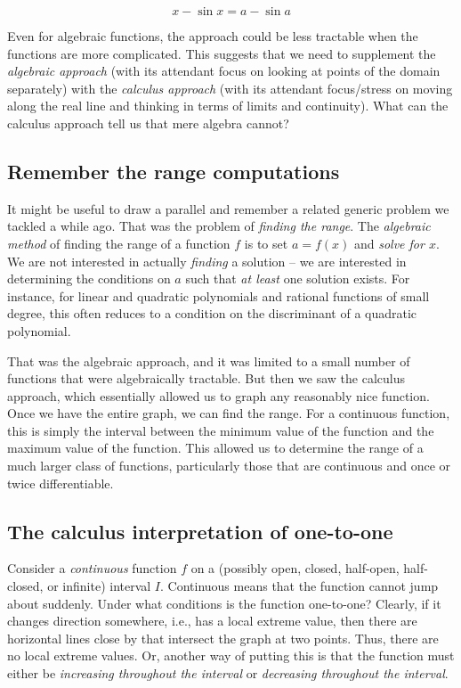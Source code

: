 \documentclass[10pt]{amsart}
\begin{document}
$$x - \sin x = a - \sin a$$

Even for algebraic functions, the approach could be less tractable
when the functions are more complicated. This suggests that we need to
supplement the {\em algebraic approach} (with its attendant focus on
looking at points of the domain separately) with the {\em calculus
approach} (with its attendant focus/stress on moving along the real
line and thinking in terms of limits and continuity). What can the
calculus approach tell us that mere algebra cannot?

\subsection{Remember the range computations}

It might be useful to draw a parallel and remember a related generic
problem we tackled a while ago. That was the problem of {\em finding
the range}. The {\em algebraic method} of finding the range of a
function $f$ is to set $a = f(x)$ and {\em solve for $x$}. We are not
interested in actually {\em finding} a solution -- we are interested
in determining the conditions on $a$ such that {\em at least} one
solution exists. For instance, for linear and quadratic polynomials
and rational functions of small degree, this often reduces to a
condition on the discriminant of a quadratic polynomial.

That was the algebraic approach, and it was limited to a small number
of functions that were algebraically tractable. But then we saw the
calculus approach, which essentially allowed us to graph any
reasonably nice function. Once we have the entire graph, we can find
the range. For a continuous function, this is simply the interval
between the minimum value of the function and the maximum value of the
function. This allowed us to determine the range of a much larger
class of functions, particularly those that are continuous and once or
twice differentiable.

\subsection{The calculus interpretation of one-to-one}

Consider a {\em continuous} function $f$ on a (possibly open, closed,
half-open, half-closed, or infinite) interval $I$. Continuous means
that the function cannot jump about suddenly. Under what conditions is
the function one-to-one? Clearly, if it changes direction somewhere,
i.e., has a local extreme value, then there are horizontal lines close
by that intersect the graph at two points. Thus, there are no local
extreme values. Or, another way of putting this is that the function
must either be {\em increasing throughout the interval} or {\em
decreasing throughout the interval}.
\end{document}
